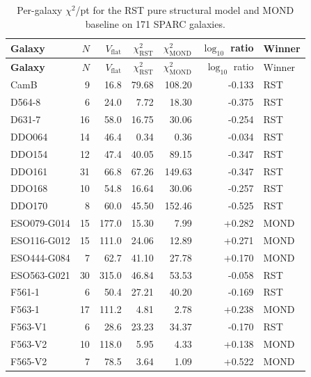 \documentclass[11pt,a4paper]{article}
\begin{document}
\begin{longtable}{lrrrrrl}
\caption{Per-galaxy $\chi^2$/pt for the RST pure structural model and MOND baseline on 171 SPARC galaxies.}
\label{tab:galaxies}\\
\toprule
\textbf{Galaxy} & $N$ & $V_{\mathrm{flat}}$ & $\chi^2_{\mathrm{RST}}$ & $\chi^2_{\mathrm{MOND}}$ & $\log_{10}$ ratio & Winner \\
\midrule
\endfirsthead
\toprule
\textbf{Galaxy} & $N$ & $V_{\mathrm{flat}}$ & $\chi^2_{\mathrm{RST}}$ & $\chi^2_{\mathrm{MOND}}$ & $\log_{10}$ ratio & Winner \\
\midrule
\endhead
\bottomrule
\endfoot
CamB                 &   9 &   16.8 &    79.68 &   108.20 & -0.133 & RST \\
D564-8               &   6 &   24.0 &     7.72 &    18.30 & -0.375 & RST \\
D631-7               &  16 &   58.0 &    16.75 &    30.06 & -0.254 & RST \\
DDO064               &  14 &   46.4 &     0.34 &     0.36 & -0.034 & RST \\
DDO154               &  12 &   47.4 &    40.05 &    89.15 & -0.347 & RST \\
DDO161               &  31 &   66.8 &    67.26 &   149.63 & -0.347 & RST \\
DDO168               &  10 &   54.8 &    16.64 &    30.06 & -0.257 & RST \\
DDO170               &   8 &   60.0 &    45.50 &   152.46 & -0.525 & RST \\
ESO079-G014          &  15 &  177.0 &    15.30 &     7.99 & +0.282 & MOND \\
ESO116-G012          &  15 &  111.0 &    24.06 &    12.89 & +0.271 & MOND \\
ESO444-G084          &   7 &   62.7 &    41.10 &    27.78 & +0.170 & MOND \\
ESO563-G021          &  30 &  315.0 &    46.84 &    53.53 & -0.058 & RST \\
F561-1               &   6 &   50.4 &    27.21 &    40.20 & -0.169 & RST \\
F563-1               &  17 &  111.2 &     4.81 &     2.78 & +0.238 & MOND \\
F563-V1              &   6 &   28.6 &    23.23 &    34.37 & -0.170 & RST \\
F563-V2              &  10 &  118.0 &     5.95 &     4.33 & +0.138 & MOND \\
F565-V2              &   7 &   78.5 &     3.64 &     1.09 & +0.522 & MOND \\

\end{longtable}
\end{document}
